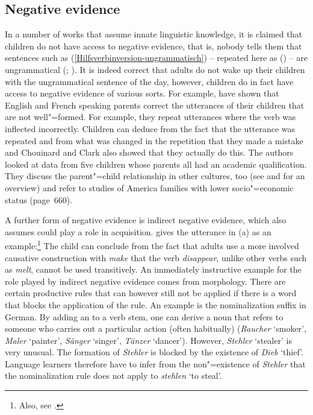 \subsection{Negative evidence}
\label{Abschnitt-negative-Evidenz}

In a number of works that assume innate linguistic knowledge, it is claimed that children do not have access to negative evidence, that is,
nobody tells them that sentences such as (\ref{Hilfsverbinversion-ungrammatisch}) -- repeated here as ()
-- are ungrammatical (\citealp[--52]{BH70a}; \citealp{Marcus93a}). 
\z
It is indeed correct that adults do not wake up their children with the ungrammatical sentence of the day, however, children do in fact have access
to negative evidence of various sorts. For example, \citet{CC2003a} have shown that English and French speaking parents
correct the utterances of their children that are not well"=formed.
For example, they repeat utterances where the verb was inflected incorrectly. Children can deduce from the fact that the utterance was repeated and from what was changed
in the repetition that they made a mistake and Chouinard and Clark also showed that they actually do this. The authors looked at data from five children whose
parents all had an academic qualification. They discuss the parent"=child relationship in other cultures, too (see  and 
for an overview) and refer to studies of America families with lower socio"=economic status (page~660). 

A further form of negative evidence is indirect negative evidence, which \citet[]{Chomsky81a} also assumes could play a role
in acquisition. \citet[Section~5.2]{Goldberg95a} gives the utterance in (a) as an example:\footnote{
Also, see .
}
\eal
{}
\zl
The child can conclude from the fact that adults use a more involved causative construction with \emph{make}
that the verb \emph{disappear}, unlike other verbs such as \emph{melt}, cannot be used transitively. 
An immediately instructive example for the role played by indirect negative evidence comes from morphology.
There are certain productive rules that can however still not be applied if there is a word that blocks
the application of the rule. An example is the  nominalization suffix in German.
By adding an  to a verb stem, one can derive a noun that refers to someone who carries out a particular
action (often habitually) (\emph{Raucher} `smoker', \emph{Maler} `painter', \emph{Sänger} `singer', \emph{Tänzer} `dancer').
However, \emph{Stehler} `stealer' is very unusual. The formation of \emph{Stehler} is blocked by the existence of \emph{Dieb} `thief'.
Language learners therefore have to infer from the non"=existence of \emph{Stehler} that the nominalization rule does not apply to \emph{stehlen} `to steal'.

